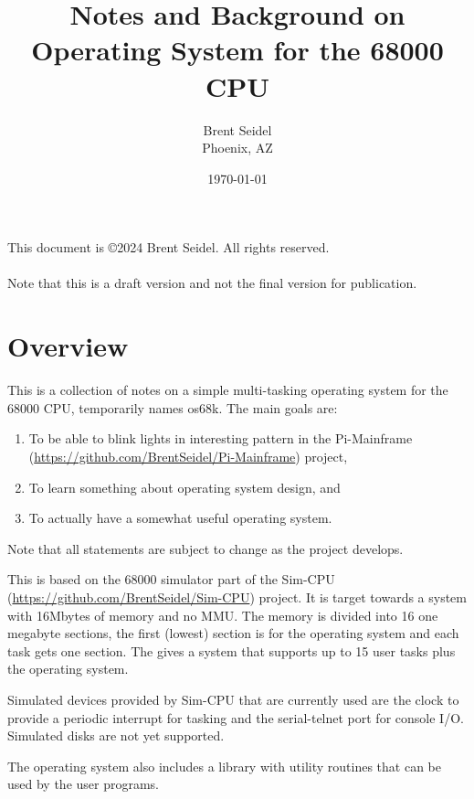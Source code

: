 \documentclass[10pt]{article}
\title{Notes and Background on Operating System for the 68000 CPU}
\author{Brent Seidel \\ Phoenix, AZ}
\date{ \today }
\begin{document}
\maketitle
\begin{center}
This document is \copyright 2024 Brent Seidel.  All rights reserved.

\paragraph{}Note that this is a draft version and not the final version for publication.
\end{center}
\tableofcontents

\section{Overview}

This is a collection of notes on a simple multi-tasking operating system for the 68000 CPU, temporarily names os68k.  The main goals are:
\begin{enumerate}
  \item To be able to blink lights in interesting pattern in the Pi-Mainframe (\url{https://github.com/BrentSeidel/Pi-Mainframe}) project,
  \item To learn something about operating system design, and
  \item To actually have a somewhat useful operating system.
\end{enumerate}

Note that all statements are subject to change as the project develops.

This is based on the 68000 simulator part of the Sim-CPU (\url{https://github.com/BrentSeidel/Sim-CPU}) project.  It is target towards a system with 16Mbytes of memory and no MMU.  The memory is divided into 16 one megabyte sections, the first (lowest) section is for the operating system and each task gets one section.  The gives a system that supports up to 15 user tasks plus the operating system.

Simulated devices provided by Sim-CPU that are currently used are the clock to provide a periodic interrupt for tasking and the serial-telnet port for console I/O.  Simulated disks are not yet supported.

The operating system also includes a library with utility routines that can be used by the user programs.
\end{document}
